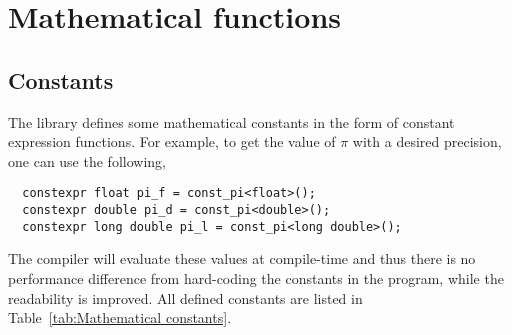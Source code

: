%
%
%
%

\chapter{Mathematical functions}
\label{chap:Mathemtical functions}

\section{Constants}
\label{sec:Constants}

The library defines some mathematical constants in the form of constant
expression functions. For example, to get the value of $\pi$ with a desired
precision, one can use the following,
\begin{Verbatim}
  constexpr float pi_f = const_pi<float>();
  constexpr double pi_d = const_pi<double>();
  constexpr long double pi_l = const_pi<long double>();
\end{Verbatim}
The compiler will evaluate these values at compile-time and thus there is no
performance difference from hard-coding the constants in the program, while the
readability is improved. All defined constants are listed in
Table~\ref{tab:Mathematical constants}.

